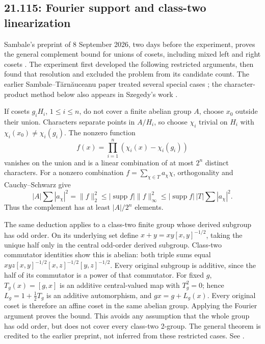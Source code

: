 \subsection{21.115: Fourier support and class-two linearization}
\label{prior:21.115}

Sambale's preprint of 8 September 2026, two days before the
experiment, proves the general complement bound for unions
of cosets, including mixed left and right cosets
\cite{sambale-cosets}. The experiment first developed the
following restricted arguments, then found that resolution
and excluded the problem from its candidate count.
The earlier Sambale--T\u arn\u auceanu paper treated several
special cases \cite{sambale-tarnauceanu}; the character-product
method below also appears in Szegedy's work \cite{szegedy}.

If cosets \(g_iH_i\), \(1\le i\le n\), do not cover a finite
abelian group \(A\), choose \(x_0\) outside their union.
Characters separate points in \(A/H_i\), so choose \(\chi_i\)
trivial on \(H_i\) with \(\chi_i(x_0)\ne\chi_i(g_i)\).
The nonzero function
\[
 f(x)=\prod_{i=1}^n(\chi_i(x)-\chi_i(g_i))
\]
vanishes on the union and is a linear combination of at most
\(2^n\) distinct characters. For a nonzero combination
\(f=\sum_{\chi\in T}a_\chi\chi\), orthogonality and
Cauchy--Schwarz give
\[
 |A|\sum|a_\chi|^2=\|f\|_2^2
 \le|\operatorname{supp}f|\|f\|_\infty^2
 \le|\operatorname{supp}f|\,|T|\sum|a_\chi|^2.
\]
Thus the complement has at least \(|A|/2^n\) elements.

The same deduction applies to a class-two finite group
whose derived subgroup has odd order. On its underlying
set define \(x+y=xy[x,y]^{-1/2}\), taking the unique half
only in the central odd-order derived subgroup.
Class-two commutator identities show this is abelian:
both triple sums equal
\(xyz[x,y]^{-1/2}[x,z]^{-1/2}[y,z]^{-1/2}\).
Every original subgroup is additive, since the half of
its commutator is a power of that commutator.
For fixed \(g\), \(T_g(x)=[g,x]\) is an additive central-valued
map with \(T_g^2=0\); hence \(L_g=1+\frac12T_g\) is an
additive automorphism, and \(gx=g+L_g(x)\).
Every original coset is therefore an affine coset in the
same abelian group. Applying the Fourier argument proves
the bound. This avoids any assumption that the whole
group has odd order, but does not cover every class-two
2-group. The general theorem is credited to the earlier
preprint, not inferred from these restricted cases.
See .


